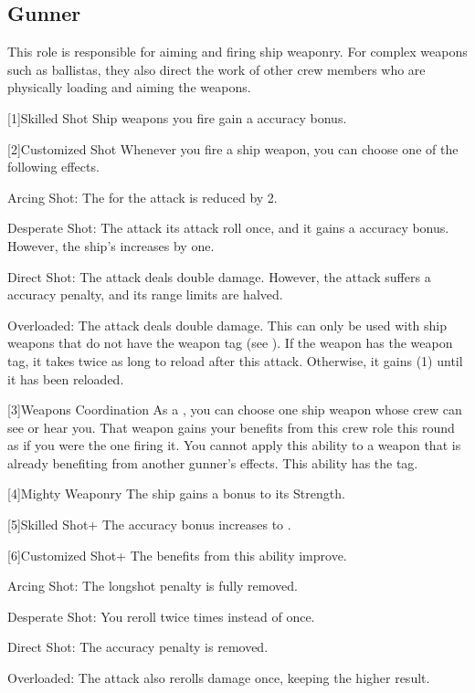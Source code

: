   \subsection{Gunner}
    This role is responsible for aiming and firing ship weaponry.
    For complex weapons such as ballistas, they also direct the work of other crew members who are physically loading and aiming the weapons.

    [1]{Skilled Shot} Ship weapons you fire gain a  accuracy bonus.

    [2]{Customized Shot} Whenever you fire a ship weapon, you can choose one of the following effects.
      \begin{raggeditemize}
        \item Arcing Shot: The  for the attack is reduced by 2.
        \item Desperate Shot: The attack  its attack roll once, and it gains a  accuracy bonus.
          However, the ship's  increases by one.
        \item Direct Shot: The attack deals double damage.
          However, the attack suffers a  accuracy penalty, and its range limits are halved.
        \item Overloaded: The attack deals double damage.
          This can only be used with ship weapons that do not have the  weapon tag (see ).
          If the weapon has the  weapon tag, it takes twice as long to reload after this attack.
          Otherwise, it gains  (1) until it has been reloaded.
      \end{raggeditemize}

    [3]{Weapons Coordination} As a , you can choose one ship weapon whose crew can see or hear you.
      That weapon gains your benefits from this crew role this round as if you were the one firing it.
      You cannot apply this ability to a weapon that is already benefiting from another gunner's effects.
      This ability has the  tag.

    [4]{Mighty Weaponry} The ship gains a  bonus to its Strength.

    [5]{Skilled Shot+} The accuracy bonus increases to .

    [6]{Customized Shot+} The benefits from this ability improve.
      \begin{raggeditemize}
        \item Arcing Shot: The longshot penalty is fully removed.
        \item Desperate Shot: You reroll twice times instead of once.
        \item Direct Shot: The accuracy penalty is removed.
        \item Overloaded: The attack also rerolls damage once, keeping the higher result.
      \end{raggeditemize}

